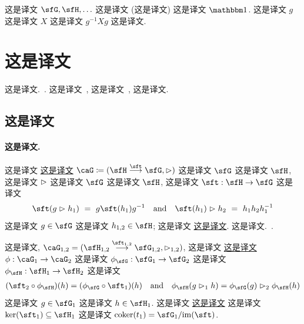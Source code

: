 \documentclass[
    affil-it, %
    auth-lg, %
    british, %
    compression, %
    contents, %
    custom-packages={}, %
    references={bigone}, %
]{lib/preprint}
\newcommand{\coker}{\mathrm{coker}}
\begin{document}
\begin{body}
\begin{remark}
 这是译文 $\sfG,\sfH,\ldots$ 这是译文 (这是译文) 这是译文 $\unit$. 这是译文 $g$ 这是译文 $X$ 这是译文 $g^{-1}Xg$ 这是译文.
        \end{remark}

        \section{这是译文}\label{sec:higherPrincipalBundles}
        
 这是译文.~\cite{Schreiber:2008aa}. 这是译文~\cite{Saemann:2019dsl}, 这是译文~\cite{Kim:2019owc,Borsten:2021ljb}, 这是译文. 

        \subsection{这是译文}
        
        \paragraph{这是译文.}
 这是译文 \uline{这是译文} $\caG\coloneqq(\sfH\overset{\sft}{\longrightarrow}\sfG,\acton)$ 这是译文 $\sfG$ 这是译文 $\sfH$, 这是译文 $\vartriangleright$ 这是译文 $\sfG$ 这是译文 $\sfH$, 这是译文 $\sft:\sfH\rightarrow\sfG$ 这是译文         \begin{equation}\label{eq:crossedModuleConditions}
            \sft(g\acton h_1)\ =\ g\sft(h_1)g^{-1}
            \eand
            \sft(h_1)\acton h_2\ =\ h_1h_2h_1^{-1}
        \end{equation}  这是译文 $g\in\sfG$ 这是译文 $h_{1,2}\in\sfH$; 这是译文 \uline{这是译文}. 这是译文.~\cite{Baez:0307200}. 
        
 这是译文, $\caG_{1,2}=(\sfH_{1,2}\overset{\sft_{1,2}}{\longrightarrow}\sfG_{1,2},\acton_{1,2})$, 这是译文 \uline{这是译文} $\phi:\caG_1\rightarrow \caG_2$ 这是译文 $\phi_\sfG:\sfG_1\rightarrow \sfG_2$ 这是译文 $\phi_\sfH:\sfH_1\rightarrow \sfH_2$ 这是译文 
        \begin{equation}
			\begin{aligned}
				(\sft_2\circ \phi_\sfH)(h)=(\phi_\sfG\circ \sft_1)(h)
                \eand 
                \phi_\sfH(g\acton_1 h)=\phi_\sfG(g)\acton_2\phi_\sfH(h)
			\end{aligned}
		\end{equation}  这是译文 $g\in \sfG_1$ 这是译文 $h\in \sfH_1$. 这是译文 \uline{这是译文} 这是译文 $\ker(\sft_1)\subseteq\sfH_1$ 这是译文 $\coker(t_1)=\sfG_1/\im(\sft)$.
        

\end{body}
\end{document}
